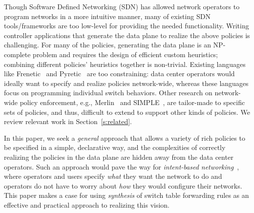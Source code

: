 Though Software Defined Networking (SDN) has allowed network operators
to program networks in a more intuitive manner, many of existing SDN
tools/frameworks are too low-level for providing the needed
functionality. Writing controller applications that generate the
data plane to realize the above policies is challenging. %
For many of the
  policies, generating the data plane is an NP-complete problem and
  requires the design of efficient custom heuristics; combining
  different policies' heuristics together is non-trivial. Existing
languages like Frenetic~\cite{frenetic} and Pyretic~\cite{pyretic} are
too constraining: data center operators would ideally want to specify
and realize policies network-wide, whereas these languages focus on
programming individual switch behaviors. %
Other research on network-wide policy enforcement, e.g.,
Merlin~\cite{Merlin} and SIMPLE~\cite{simple}, are tailor-made to
specific sets of policies, and thus, difficult to extend to support
other kinds of policies. We review relevant work in
Section~\ref{s:related}.


In this paper, we seek a {\em general} approach that allows a variety
of rich policies to be specified in a simple, declarative way, and the
complexities of correctly realizing the policies in the data plane are
hidden away from the data center operators. Such an approach would
pave the way for {\em intent-based networking}~\cite{}, where
operators and users specify {\em what} they want the network to do and
operators do not have to worry about {\em how} they would configure
their networks. %
This paper makes a case for using \emph{synthesis} of switch table
forwarding rules as an effective and practical approach to realizing
this vision.

